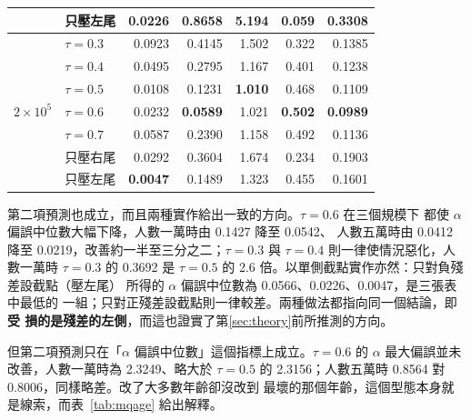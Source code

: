 \documentclass[UTF8, fontset=macnew, a4paper, 12pt]{ctexart}
\begin{document}
\begin{table}[H]
\begin{tabular}{llrrrrr}
 & 只壓左尾                & \textbf{0.0226} & 0.8658 & 5.194 & 0.059 & 0.3308\\
\midrule
\multirow{7}{*}{$2\times10^5$}
 & $\tau=0.3$              & 0.0923 & 0.4145 & 1.502 & 0.322 & 0.1385\\
 & $\tau=0.4$              & 0.0495 & 0.2795 & 1.167 & 0.401 & 0.1238\\
 & $\tau=0.5$              & 0.0108 & 0.1231 & \textbf{1.010} & 0.468 & 0.1109\\
 & $\tau=0.6$              & 0.0232 & \textbf{0.0589} & 1.021 & \textbf{0.502} & \textbf{0.0989}\\
 & $\tau=0.7$              & 0.0587 & 0.2390 & 1.158 & 0.492 & 0.1136\\
 & 只壓右尾                & 0.0292 & 0.3604 & 1.674 & 0.234 & 0.1903\\
 & 只壓左尾                & \textbf{0.0047} & 0.1489 & 1.323 & 0.455 & 0.1601\\
\bottomrule
\end{tabular}
\label{tab:mqtau}
\end{table}

第二項預測也成立，而且兩種實作給出一致的方向。$\tau=0.6$ 在三個規模下
都使 $\alpha$ 偏誤中位數大幅下降，人數一萬時由 0.1427 降至 0.0542、
人數五萬時由 0.0412 降至 0.0219，改善約一半至三分之二；$\tau=0.3$ 與
$\tau=0.4$ 則一律使情況惡化，人數一萬時 $\tau=0.3$ 的 0.3692 是
$\tau=0.5$ 的 2.6 倍。以單側截點實作亦然：只對負殘差設截點（壓左尾）
所得的 $\alpha$ 偏誤中位數為 0.0566、0.0226、0.0047，是三張表中最低的
一組；只對正殘差設截點則一律較差。兩種做法都指向同一個結論，即\textbf{受
損的是殘差的左側}，而這也證實了第\ref{sec:theory}前所推測的方向。

但第二項預測只在「$\alpha$ 偏誤中位數」這個指標上成立。$\tau=0.6$ 的
$\alpha$ 最大偏誤並未改善，人數一萬時為 2.3249、略大於 $\tau=0.5$ 的
2.3156；人數五萬時 0.8564 對 0.8006，同樣略差。改了大多數年齡卻沒改到
最壞的那個年齡，這個型態本身就是線索，而表~\ref{tab:mqage} 給出解釋。
\end{document}
